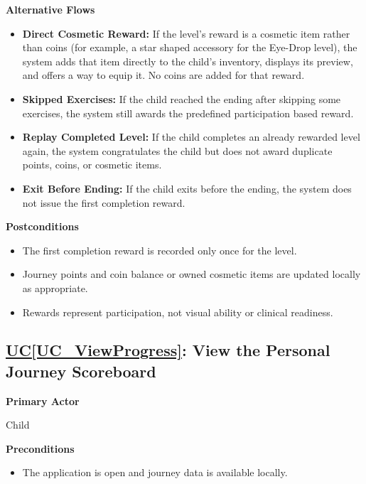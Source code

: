 \documentclass[12pt]{article}
\newcounter{ucnum} %
\newcommand{\ucref}[1]{\hyperref[#1]{UC\ref*{#1}}}
\begin{document}
\textbf{Alternative Flows}
\begin{itemize}
    \item \textbf{Direct Cosmetic Reward:} If the level's reward is
    a cosmetic item rather than coins (for example, a star shaped
    accessory for the Eye-Drop level), the system adds that item
    directly to the child's inventory, displays its preview, and
    offers a way to equip it. No coins are added for that reward.
    \item \textbf{Skipped Exercises:} If the child reached the ending
    after skipping some exercises, the system still awards the
    predefined participation based reward.
    \item \textbf{Replay Completed Level:} If the child completes an
    already rewarded level again, the system congratulates the child
    but does not award duplicate points, coins, or cosmetic items.
    \item \textbf{Exit Before Ending:} If the child exits before the
    ending, the system does not issue the first completion reward.
\end{itemize}

\textbf{Postconditions}
\begin{itemize}
    \item The first completion reward is recorded only once for
    the level.
    \item Journey points and coin balance or owned cosmetic items
    are updated locally as appropriate.
    \item Rewards represent participation, not visual ability
    or clinical readiness.
\end{itemize}

\label{UC_ViewProgress}
\subsection{\ucref{UC_ViewProgress}: View the Personal Journey Scoreboard}

\textbf{Primary Actor}

Child

\textbf{Preconditions}
\begin{itemize}
    \item The application is open and journey data is available locally.
\end{itemize}
\end{document}
